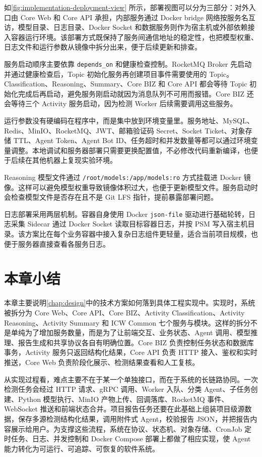 如\cref{fig:implementation-deployment-view} 所示，部署视图可以分为三部分：对外入口由 Core Web 和 Core API 承担，内部服务通过 Docker bridge 网络按服务名互访，模型目录、日志目录、Docker Socket 和数据服务则作为宿主机或外部依赖接入容器运行环境。该部署方式既保持了服务间通信地址的稳定性，也把模型权重、日志文件和运行参数从镜像中拆分出来，便于后续更新和排查。

服务启动顺序主要依靠 \texttt{depends\_on} 和健康检查控制。RocketMQ Broker 先启动并通过健康检查后，Topic 初始化服务再创建项目事件需要使用的 Topic。Classification、Reasoning、Summary、Core BIZ 和 Core API 都会等待 Topic 初始化完成后再启动，避免服务刚启动就因为消息队列不可用而报错。Core BIZ 还会等待三个 Activity 服务启动，因为检测 Worker 后续需要调用这些服务。

运行参数没有硬编码在程序中，而是集中放到环境变量里。服务地址、MySQL、Redis、MinIO、RocketMQ、JWT、邮箱验证码 Secret、Socket Ticket、对象存储 TTL、Agent Token、Agent Bot ID、任务超时和并发数量等都可以通过环境变量调整。本地调试和服务器部署只需要更换配置值，不必修改代码重新编译，也便于后续在其他机器上复现实验环境。

Reasoning 模型文件通过 \texttt{/root/models:/app/models:ro} 方式挂载进 Docker 镜像。这样可以避免模型权重导致镜像体积过大，也便于更新模型文件。服务启动时会检查模型文件是否存在且不是 Git LFS 指针，提前暴露部署问题。

日志部署采用两层机制。容器自身使用 Docker \texttt{json-file} 驱动进行基础轮转，日志采集 Sidecar 通过 Docker Socket 读取目标容器日志，并按 PSM 写入宿主机目录。该方案比在每个业务容器中接入复杂日志组件更轻量，适合当前项目规模，也便于服务器直接查看各服务日志。

\section{本章小结}
\label{sec:implementation-chapter-summary}

本章主要说明\cref{chap:design}中的技术方案如何落到具体工程实现中。实现时，系统被拆分为 Core Web、Core API、Core BIZ、Activity Classification、Activity Reasoning、Activity Summary 和 ICW Common 七个服务与模块。这样的拆分不是单纯为了增加服务数量，而是为了让前端交互、业务状态、Agent 调用、模型推理、报告生成和共享协议各自有明确位置。Core BIZ 负责控制任务状态和数据库事务，Activity 服务只返回结构化结果，Core API 负责 HTTP 接入、鉴权和实时推送，Core Web 负责阶段化展示、检测结果查看和人工复核。

从实现过程看，难点主要不在于某一个单独接口，而在于系统的长链路协同。一次检测任务会经过 HTTP 请求、gRPC 调用、Worker 入队、分类 Agent、子任务创建、Python 模型执行、MinIO 产物上传、回调落库、RocketMQ 事件、WebSocket 推送和前端状态合并。项目报告任务还要在此基础上组装项目级源数据，保存多源检测结构化结果，调用附件式 Agent，校验报告 JSON，并把报告内容展示给用户。为支撑这些流程，系统在协议、状态机、对象存储、CronJob 定时任务、日志、并发控制和 Docker Compose 部署上都做了相应实现，使 Agent 能力转化为可运行、可追踪、可恢复的软件系统。
